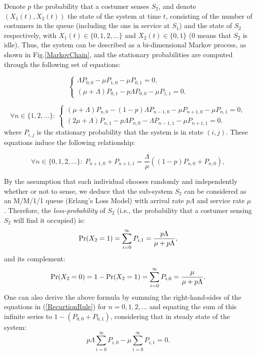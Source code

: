 \documentclass[11pt]{article}
\numberwithin{equation}{section}
\newcommand{\pr}{{\rm Pr}}
\begin{document}
Denote $p$ the probability that a costumer senses $S_{2}$, and denote $(X_{1}(t), X_{2}(t))$ the state of the system at time $t$, consisting of the number of costumers in the queue (including the one in service at $S_{1}$) and the state of $S_{2}$ respectively, with $X_{1}(t) \in \lbrace0, 1, 2, \ldots\rbrace$ and $X_{2}(t) \in \lbrace0, 1\rbrace$ (0 means that $S_{2}$ is idle). Thus, the system can be described as a bi-dimensional Markov process, as shown in Fig.\ref{MarkovChain}, and the stationary probabilities are computed through the following set of equations: 

\begin{equation}
  \begin{cases}
    \Lambda P_{0,0} - \mu P_{1,0}  - \mu P_{0,1} = 0 ,\\
    (\mu+\Lambda) P_{0,1} - p\Lambda P_{0,0}  - \mu P_{1,1} = 0  .
  \end{cases}
	\label{StateEq1}
\end{equation}

\begin{equation}
  \forall n \in \lbrace 1, 2, \ldots \rbrace: \ \begin{cases}
    (\mu+\Lambda) P_{n,0} - (1-p) \Lambda P_{n-1, 0} - \mu P_{n+1,0}  - \mu P_{n,1} = 0,\\
    (2\mu+\Lambda) P_{n,1} - p\Lambda P_{n,0}  - \Lambda P_{n-1,1} - \mu P_{n+1,1} = 0.
  \end{cases} \label{StateEq2}
\end{equation}
where $P_{i,j}$ is the stationary probability that the system is in state $(i,j)$. These equations induce the following relationship:

\begin{equation}
  \forall n \in \lbrace 0, 1, 2, \ldots \rbrace: \ 
    P_{n+1,0} + P_{n+1,1} = \dfrac{\Lambda}{\mu}((1-p) P_{n,0} +  P_{n, 0}), \label{RecurtionRule}
\end{equation}

By the assumption that each individual chooses randomly and independently whether or not to sense, we deduce that the sub-system $S_{2}$ can be considered as an M/M/1/1 queue (Erlang's Loss Model) with arrival rate $p\Lambda$ and service rate $\mu$. Therefore, the {\it loss-probability} of $S_{2}$ (i.e., the probability that a costumer sensing $S_{2}$ will find it occupied) is:
\begin{equation}
	\pr(X_2=1) = \sum\limits_{i=0}^{\infty} P_{i, 1} = \dfrac{p\Lambda}{\mu+p\Lambda}, \label{LossProb}
\end{equation}
and its complement:
\begin{equation}
	\pr(X_2=0) = 1-\pr(X_2=1) = \sum\limits_{i=0}^{\infty} P_{i, 0} = \dfrac{\mu}{\mu+p\Lambda}. \label{OMLossProb}
\end{equation}
One can also derive the above formula by summing the right-hand-sides of the equations in (\ref{RecurtionRule}) for $n=0,1,2,\ldots$ and equating the sum of this infinite series to $1-(P_{0,0}+P_{0,1})$, considering that in steady state of the system: \[ p\Lambda\sum_{i=0}^{\infty}P_{i,0} - \mu \sum_{i=0}^{\infty}P_{i,1} = 0.\]
\end{document}
